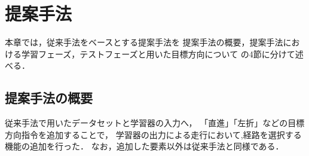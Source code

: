 \chapter{提案手法}\label{chap:method}
本章では，従来手法をベースとする提案手法を
提案手法の概要，提案手法における学習フェーズ，テストフェーズと用いた目標方向について
の4節に分けて述べる．

\section{提案手法の概要}

従来手法で用いたデータセットと学習器の入力へ，
「直進」「左折」などの目標方向指令を追加することで，
学習器の出力による走行において,経路を選択する機能の追加を行った．
なお，追加した要素以外は従来手法と同様である．



        


